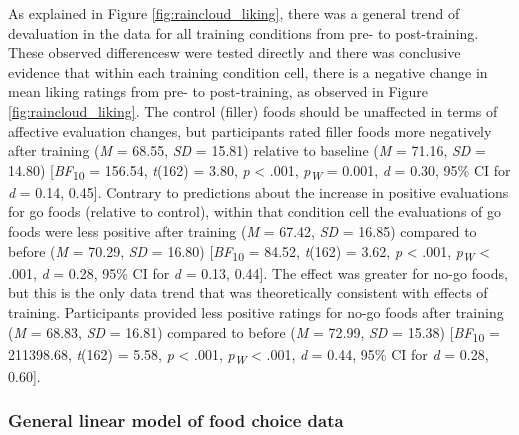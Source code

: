 \documentclass[man,floatsintext]{apa6}
\begin{document}
As explained in Figure \ref{fig:raincloud_liking}, there was a general trend of devaluation in the data for all training conditions from pre- to post-training. These observed differencesw were tested directly and there was conclusive evidence that within each training condition cell, there is a negative change in mean liking ratings from pre- to post-training, as observed in Figure \ref{fig:raincloud_liking}. The control (filler) foods should be unaffected in terms of affective evaluation changes, but participants rated filler foods more negatively after training (\emph{M} = 68.55, \emph{SD} = 15.81) relative to baseline (\emph{M} = 71.16, \emph{SD} = 14.80) {[}\emph{BF}\textsubscript{10} = 156.54, \emph{t}(162) = 3.80, \emph{p} \textless{} .001, \textit{p\textsubscript{W}} = 0.001, \emph{d} = 0.30, 95\% CI for \emph{d} = 0.14, 0.45{]}. Contrary to predictions about the increase in positive evaluations for go foods (relative to control), within that condition cell the evaluations of go foods were less positive after training (\emph{M} = 67.42, \emph{SD} = 16.85) compared to before (\emph{M} = 70.29, \emph{SD} = 16.80) {[}\emph{BF}\textsubscript{10} = 84.52, \emph{t}(162) = 3.62, \emph{p} \textless{} .001, \textit{p\textsubscript{W}} \textless{} .001, \emph{d} = 0.28, 95\% CI for \emph{d} = 0.13, 0.44{]}. The effect was greater for no-go foods, but this is the only data trend that was theoretically consistent with effects of training. Participants provided less positive ratings for no-go foods after training (\emph{M} = 68.83, \emph{SD} = 16.81) compared to before (\emph{M} = 72.99, \emph{SD} = 15.38) {[}\emph{BF}\textsubscript{10} = 211398.68, \emph{t}(162) = 5.58, \emph{p} \textless{} .001, \textit{p\textsubscript{W}} \textless{} .001, \emph{d} = 0.44, 95\% CI for \emph{d} = 0.28, 0.60{]}.

\hypertarget{glm}{%
\subsubsection{General linear model of food choice data}\label{glm}}

\par
\end{document}
